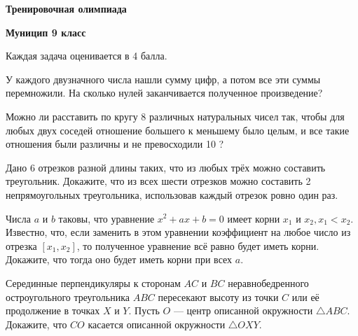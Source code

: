 \centerline{\bf \Huge Тренировочная олимпиада}
\centerline{\bf \Huge Муницип 9 класс}

\begin{flushright}
        \scriptsize{Каждая задача оценивается в 4 балла.}
\end{flushright}

 У каждого двузначного числа нашли сумму цифр, а потом все эти суммы перемножили. На сколько нулей заканчивается полученное произведение?

 Можно ли расставить по кругу 8 различных натуральных чисел так, чтобы для любых двух соседей отношение большего к меньшему было целым, и все такие отношения были различны и не превосходили 10 ?

 Дано 6 отрезков разной длины таких, что из любых трёх можно составить треугольник. Докажите, что из всех шести отрезков можно составить 2 непрямоугольных треугольника, использовав каждый отрезок ровно один раз.

 Числа $a$ и $b$ таковы, что уравнение $x^2+a x+b=0$ имеет корни $x_1$ и $x_2, x_1<x_2$. Известно, что, если заменить в этом уравнении коэффициент на любое число из отрезка $\left[x_1, x_2\right]$, то полученное уравнение всё равно будет иметь корни. Докажите, что тогда оно будет иметь корни при всех $a$.

 Серединные перпендикуляры к сторонам $A C$ и $B C$ неравнобедренного остроугольного треугольника $A B C$ пересекают высоту из точки $C$ или её продолжение в точках $X$ и $Y$. Пусть $O$ --- центр описанной окружности $\triangle A B C$. Докажите, что $C O$ касается описанной окружности $\triangle O X Y$.